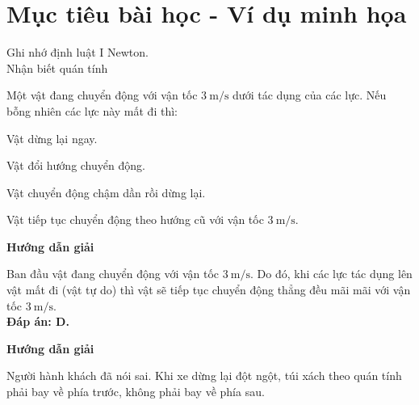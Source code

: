 \section{Mục tiêu bài học - Ví dụ minh họa}
\begin{dang}{Ghi nhớ định luật I Newton. \\ Nhận biết quán tính}
	{Một vật đang chuyển động với vận tốc $\SI{3}{\meter/\second}$ dưới tác dụng của các lực. Nếu bỗng nhiên các lực này mất đi thì:
	\begin{mcq}
		\item Vật dừng lại ngay.
		\item Vật đổi hướng chuyển động.
		\item Vật chuyển động chậm dần rồi dừng lại.
		\item Vật tiếp tục chuyển động theo hướng cũ với vận tốc $\SI{3}{\meter/\second}$.
\end{mcq}}
	{
\begin{center}
	\textbf{Hướng dẫn giải}
\end{center}	
Ban đầu vật đang chuyển động với vận tốc $\SI{3}{\meter/\second}$. Do đó, khi các lực tác dụng lên vật mất đi (vật tự do) thì vật sẽ tiếp tục chuyển động thẳng đều mãi mãi với vận tốc $\SI{3}{\meter/\second}$.\\
\textbf{Đáp án: D.}
}
	{	\begin{center}
			\textbf{Hướng dẫn giải}
		\end{center}
		
		Người hành khách đã nói sai. Khi xe dừng lại đột ngột, túi xách theo quán tính phải bay về phía trước, không phải bay về phía sau.
		
	}
\end{dang}	

